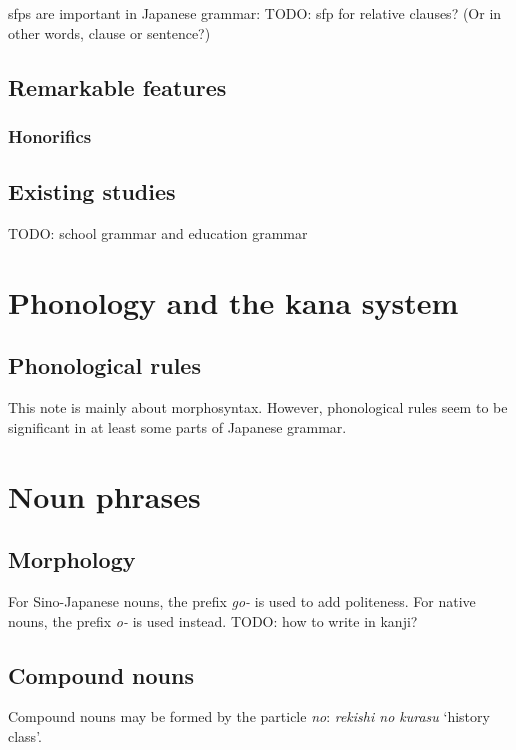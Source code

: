 \documentclass[UTF8, a4paper, oneside, scheme=plain]{ctexart}
\newcommand{\corpus}[1]{\emph{#1}}
\newcommand{\translate}[1]{`#1'}
\begin{document}
\acs{sfp}s are important in Japanese grammar:
TODO: sfp for relative clauses? (Or in other words, clause or sentence?)

\subsection{Remarkable features}

\subsubsection{Honorifics}

\subsection{Existing studies}

TODO: school grammar and education grammar

\section{Phonology and the kana system}

\subsection{Phonological rules}

This note is mainly about morphosyntax.
However, phonological rules seem to be significant in at least some parts of Japanese grammar.


\section{Noun phrases}

\subsection{Morphology}

For Sino-Japanese nouns, the prefix \corpus{go-} is used to add politeness.
For native nouns, the prefix \corpus{o-} is used instead.
TODO: how to write in kanji?

\subsection{Compound nouns}

Compound nouns may be formed by the particle \corpus{no}:
\corpus{rekishi no kurasu} \translate{history class}.
\end{document}
